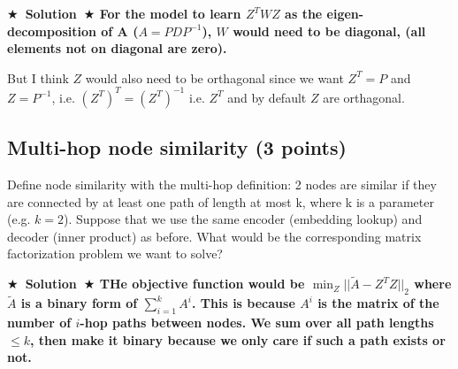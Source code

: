 \documentclass{article}
\numberwithin{figure}{section}
\newcommand{\Solution}[1]{{\medskip \color{red} \bf $\bigstar$~\sf \textbf{Solution}~$\bigstar$ \sf #1 } \bigskip}
\begin{document}
\Solution{For the model to learn $Z^{T}WZ$ as the eigen-decomposition of A ($A=PDP^{-1}$), 
$W$ would need to be diagonal, (all elements not on diagonal are zero). 

But I think $Z$ would also need to be orthagonal since we want $Z^{T}=P$ and $Z =P^{-1}$, i.e. $(Z^T)^T=(Z^T)^{-1}$ i.e. $Z^T$ and by default $Z$ are orthagonal.}

\subsection{Multi-hop node similarity (3 points)}
Define node similarity with the multi-hop definition: 2 nodes are similar if they are connected by at least one path of length at most k, where k is a parameter (e.g. $k = 2$). Suppose that we use the same encoder (embedding lookup) and decoder (inner product) as before. What would be the corresponding matrix factorization problem we want to solve?

\Solution{THe objective function would be $\min_Z ||\tilde{A} - Z^{T}Z||_2$ where $\tilde{A}$ is a binary form of $\sum_{i=1}^{k}A^i$. 
This is because $A^i$ is the matrix of the number of $i$-hop paths between nodes. We sum over all path lengths $\leq k$, then make it binary
because we only care if such a path exists or not. }
\end{document}
